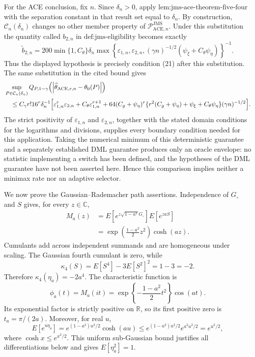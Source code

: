 For the ACE conclusion, fix \(n\).  Since \(\delta_n>0\), apply \(\text{lem:jms-ace-theorem-five-four}\) with the separation constant in that result set equal to \(\delta_n\).  By construction, \(\mathcal C_n(\delta_n)\) changes no other member property of \(\mathcal P_{\mathrm{ACE},n}^{\mathrm{JMS}}\).  Under this substitution the quantity called \(b_{2,n}\) in \(\text{def:jms-eligibility}\) becomes exactly
\[
 \widetilde b_{2,n}=200\min\{1,C_\theta\}\delta_n
 \max\!\left\{\varepsilon_{1,n},\varepsilon_{2,n},
   (\gamma n)^{-1/2}(\psi_\xi+C_\theta\psi_\eta)\right\}^{-1}.
\]
Thus the displayed hypothesis is precisely condition (21) after this substitution.  The same substitution in the cited bound gives
\[
\begin{aligned}
 &\sup_{P\in\mathcal C_n(\delta_n)}Q_{P,1-\gamma}
 \!\left(\left|\widehat\theta_{\mathrm{ACE},r,n}-\theta_0(P)\right|\right)\\
 &\quad\le C_\gamma r!16^r\delta_n^{-1}
 \Bigl[\varepsilon_{1,n}^r\varepsilon_{2,n}
 +C_\theta\varepsilon_{1,n}^{r+1}
 +64(C_g+\psi_\eta)^r
 \{r^2(C_g+\psi_\eta)+\psi_\xi+C_\theta\psi_\eta\}
 (\gamma n)^{-1/2}\Bigr].
\end{aligned}
\]
The strict positivity of \(\varepsilon_{1,n}\) and \(\varepsilon_{2,n}\), together with the stated domain conditions for the logarithms and divisions, supplies every boundary condition needed for this application.  Taking the numerical minimum of this deterministic guarantee and a separately established DML guarantee produces only an oracle envelope: no statistic implementing a switch has been defined, and the hypotheses of the DML guarantee have not been asserted here.  Hence this comparison implies neither a minimax rate nor an adaptive selector.

We now prove the Gaussian--Rademacher path assertions.  Independence of \(G_\circ\) and \(S\) gives, for every \(z\in\mathbb C\),
\[
\begin{aligned}
 M_a(z)
 &=E[e^{z\sqrt{1-a^2}G_\circ}]E[e^{zaS}]\\
 &=\exp\!\left(\frac{1-a^2}{2}z^2\right)\cosh(az).
\end{aligned}
\]
Cumulants add across independent summands and are homogeneous under scaling.  The Gaussian fourth cumulant is zero, while
\[
 \kappa_4(S)=E[S^4]-3E[S^2]^2=1-3=-2.
\]
Therefore \(\kappa_4(\eta_a)=-2a^4\).  The characteristic function is
\[
 \phi_a(t)=M_a(it)
 =\exp\!\left\{-\frac{1-a^2}{2}t^2\right\}\cos(at).
\]
Its exponential factor is strictly positive on \(\mathbb R\), so its first positive zero is \(t_a=\pi/(2a)\).  Moreover, for real \(u\),
\[
 E[e^{u\eta_a}]
 =e^{(1-a^2)u^2/2}\cosh(au)
 \le e^{(1-a^2)u^2/2}e^{a^2u^2/2}=e^{u^2/2},
\]
where \(\cosh x\le e^{x^2/2}\).  This uniform sub-Gaussian bound justifies all differentiations below and gives \(E[\eta_a^2]=1\).

